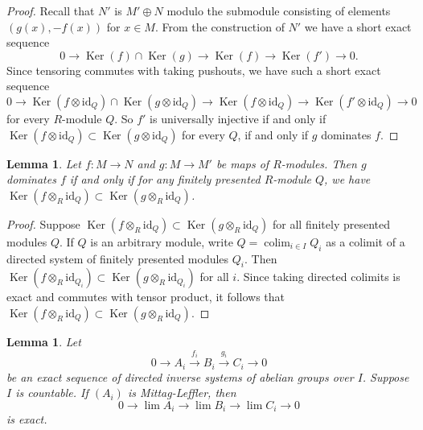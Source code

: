 \documentclass{amsart}
\theoremstyle{plain}
\newtheorem{lemma}[subsection]{Lemma}
\theoremstyle{definition}
\theoremstyle{remark}
\numberwithin{equation}{subsection}
\def\lim{\mathop{\mathrm{lim}}\nolimits}
\def\colim{\mathop{\mathrm{colim}}\nolimits}
\def\Ker{\mathop{\mathrm{Ker}}}
\begin{document}
\begin{proof}
Recall that $N'$ is $M' \oplus N$ modulo the submodule consisting of elements
$(g(x), -f(x))$ for $x \in M$.
From the construction of $N'$ we have a short exact sequence
$$
0 \to \Ker(f) \cap \Ker(g) \to \Ker(f) \to \Ker(f')
\to 0.
$$
Since tensoring commutes with taking pushouts, we have such a short exact
sequence
$$
0 \to \Ker(f \otimes \text{id}_Q ) \cap \Ker(g \otimes
\text{id}_Q) \to \Ker(f \otimes \text{id}_Q)
\to \Ker(f' \otimes \text{id}_Q) \to 0
$$
for every $R$-module $Q$.  So $f'$ is universally injective if and only if
$\Ker(f \otimes \text{id}_Q ) \subset \Ker(g \otimes
\text{id}_Q)$ for every $Q$, if and only if $g$ dominates $f$.
\end{proof}


\begin{lemma}
\label{lemma-domination-fp}
Let $f: M \to N$ and $g: M \to M'$ be maps of $R$-modules.
Then $g$ dominates $f$ if and only if for any finitely presented $R$-module
$Q$, we have $\Ker(f \otimes_R \text{id}_Q) \subset \Ker(g \otimes_R
\text{id}_Q)$.
\end{lemma}

\begin{proof}
Suppose $\Ker(f \otimes_R \text{id}_Q) \subset \Ker(g \otimes_R
\text{id}_Q)$ for all finitely presented modules $Q$.  If $Q$ is an
arbitrary module, write $Q = \colim_{i \in I} Q_i$ as a colimit of a
directed
system of finitely presented modules $Q_i$.  Then $\Ker(f \otimes_R
\text{id}_{Q_i}) \subset \Ker(g \otimes_R \text{id}_{Q_i})$ for
all $i$.  Since taking directed colimits is exact and commutes with tensor
product, it follows that $\Ker(f \otimes_R \text{id}_Q) \subset \Ker(g
\otimes_R \text{id}_Q)$.
\end{proof}


\begin{lemma}
\label{lemma-ML-exact-sequence}
Let
$$
0 \to A_i \xrightarrow{f_i} B_i \xrightarrow{g_i} C_i \to 0
$$
be an exact sequence of directed inverse systems of abelian groups over $I$.
Suppose $I$ is countable.  If $(A_i)$ is Mittag-Leffler, then
$$
0 \to \lim A_i \to \lim B_i \to \lim C_i\to 0
$$
is exact.
\end{lemma}
\end{document}
